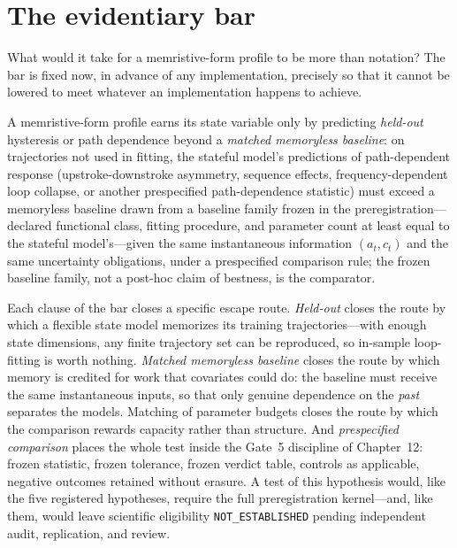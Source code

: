 \section{The evidentiary bar}\label{mem:sec:bar}

What would it take for a memristive-form profile to be more than notation? The bar is fixed now, in advance of any implementation, precisely so that it cannot be lowered to meet whatever an implementation happens to achieve.

\begin{ruleenv}\label{mem:rule:bar}
A memristive-form profile earns its state variable only by predicting \emph{held-out} hysteresis or path dependence beyond a \emph{matched memoryless baseline}: on trajectories not used in fitting, the stateful model's predictions of path-dependent response (upstroke-downstroke asymmetry, sequence effects, frequency-dependent loop collapse, or another prespecified path-dependence statistic) must exceed a memoryless baseline drawn from a baseline family frozen in the preregistration---declared functional class, fitting procedure, and parameter count at least equal to the stateful model's---given the same instantaneous information $(a_t, c_t)$ and the same uncertainty obligations, under a prespecified comparison rule; the frozen baseline family, not a post-hoc claim of bestness, is the comparator.
\end{ruleenv}

Each clause of the bar closes a specific escape route. \emph{Held-out} closes the route by which a flexible state model memorizes its training trajectories---with enough state dimensions, any finite trajectory set can be reproduced, so in-sample loop-fitting is worth nothing. \emph{Matched memoryless baseline} closes the route by which memory is credited for work that covariates could do: the baseline must receive the same instantaneous inputs, so that only genuine dependence on the \emph{past} separates the models. Matching of parameter budgets closes the route by which the comparison rewards capacity rather than structure. And \emph{prespecified comparison} places the whole test inside the Gate~5 discipline of Chapter~12: frozen statistic, frozen tolerance, frozen verdict table, controls as applicable, negative outcomes retained without erasure. A test of this hypothesis would, like the five registered hypotheses, require the full preregistration kernel---and, like them, would leave scientific eligibility \texttt{NOT\_ESTABLISHED} pending independent audit, replication, and review.


